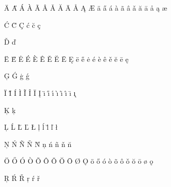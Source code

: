 \documentclass[a4paper,10pt]{article}
\newcommand{\page}{\newpage} %
\newcommand{\command}[2][]{#2\page}
\begin{document}
%
\pagestyle{empty}
%
\command{\"{A}}
\command{\H{A}}
\command{\'{A}}
\command{\`{A}}
\command{\~{A}}
\command{\^{A}}
\command{\v{A}}
\command{\u{A}}
\command{\={A}}
\command{\AA{}}
\command{\k{A}}
\command{\AE{}}
\command{\"{a}}
\command{\H{a}}
\command{\'{a}}
\command{\`{a}}
\command{\~{a}}
\command{\^{a}}
\command{\v{a}}
\command{\u{a}}
\command{\={a}}
\command{\aa{}}
\command{\k{a}}
\command{\ae{}}\par
\command{\'{C}}
\command{\u{C}}
\command{\c{C}}
\command{\'{c}}
\command{\u{c}}
\command{\c{c}}\par
\command{\v{D}}
\command{\DJ}
\command{\DH}
\command{\v{d}}
\command{\dj}
\command{\dh}\par
\command{\"{E}}
\command{\H{E}}
\command{\.{E}}
\command{\'{E}}
\command{\`{E}}
\command{\^{E}}
\command{\v{E}}
\command{\u{E}}
\command{\={E}}
\command{\k{E}}
\command{\"{e}}
\command{\H{e}}
\command{\.{e}}
\command{\'{e}}
\command{\`{e}}
\command{\^{e}}
\command{\v{e}}
\command{\u{e}}
\command{\={e}}
\command{\k{e}}\par
\command{\c{G}}
\command{\'{G}}
\command{\c{g}}
\command{\'{g}}\par
\command{\"{I}}
\command{\H{I}}
\command{\'{I}}
\command{\`{I}}
\command{\~{I}}
\command{\^{I}}
\command{\={I}}
\command{\k{I}}
\command{\"{\i}}
\command{\H{\i}}
\command{\'{\i}}
\command{\`{\i}}
\command{\~{\i}}
\command{\^{\i}}
\command{\={\i}}
\command{\k{\i}}\par
\command{\c{K}}
\command{\c{k}}\par
\command{\c{L}}
\command{\'{L}}
\command{\u{L}}
\command{\v{L}}
\command{\L}
\command{\c{l}}
\command{\'{l}}
\command{\u{l}}
\command{\v{l}}
\command{\l}\par
\command{\c{N}}
\command{\'{N}}
\command{\~{N}}
\command{\v{N}}
\command{\u{N}}
\command{\NG}
\command{\c{n}}
\command{\'{n}}
\command{\~{n}}
\command{\v{n}}
\command{\u{n}}
\command{\ng}\par
\command{\"{O}}
\command{\H{O}}
\command{\'{O}}
\command{\`{O}}
\command{\~{O}}
\command{\^{O}}
\command{\v{O}}
\command{\u{O}}
\command{\={O}}
\command{\O{}}
\command{\k{O}}
\command{\"{o}}
\command{\H{o}}
\command{\'{o}}
\command{\`{o}}
\command{\~{o}}
\command{\^{o}}
\command{\v{o}}
\command{\u{o}}
\command{\={o}}
\command{\o{}}
\command{\k{o}}\par
\command{\TH}
\command{\th}\par
\command{\c{R}}
\command{\'{R}}
\command{\v{R}}
\command{\c{r}}
\command{\'{r}}
\command{\v{r}}\par
\end{document}
